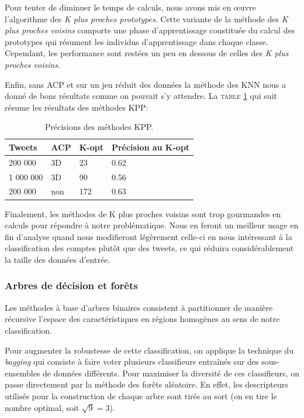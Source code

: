 \documentclass[twocolumn,10pt]{article}
\begin{document}
Pour tenter de diminuer le temps de calculs, nous avons mis en œuvre l'algorithme des \textit{K plus proches prototypes}. Cette variante de la méthode des \textit{K plus proches voisins} comporte une phase d'apprentissage constituée du calcul des prototypes qui résument les individus d'apprentissage dans chaque classe. Cependant, les performance sont restées un peu en dessous de celles des \textit{K plus proches voisins}.

Enfin, sans ACP et sur un jeu réduit des données la méthode des KNN nous a donné de bons résultats comme on pouvait s'y attendre. La \textsc{table} \ref{tab:PKPP} qui suit résume les résultats des méthodes KPP:

\begin{table}[htbp]
\begin{center}
\noindent\begin{tabular}{llll}
Tweets & ACP & K-opt & Précision au K-opt \\ 
\hline 
200 000 & 3D & 23 & 0.62 \\
1 000 000 & 3D & 90 & 0.56 \\
200 000 & non & 172 & 0.63 \\
\end{tabular}
\caption{\label{tab:PKPP} Précisions des méthodes KPP.}
\end{center} 
\end{table}

Finalement, les méthodes de K plus proches voisins sont trop gourmandes en calculs pour répondre à notre problématique. Nous en feront un meilleur usage en fin d'analyse quand nous modifieront légèrement celle-ci en nous intéressant à la classification des comptes plutôt que des tweets, ce qui réduira considérablement la taille des données d'entrée.

\subsubsection{Arbres de décision et forêts}

Les méthodes à base d'arbres binaires consistent à partitionner de manière récursive
l'espace des caractéristiques en régions homogènes au sens de notre classification.

Pour augmenter la robustesse de cette classification, on applique la technique du \textit{bagging} qui consiste à faire voter plusieurs classifieurs entraînés sur des sous-ensembles de données différents. Pour maximiser la diversité de ces classifieurs, on passe directement par la méthode des forêts aléatoire. En effet, les descripteurs utilisés pour la construction de chaque arbre sont tirés au sort (on en tire le nombre optimal, soit $\sqrt{9}=3$).
\end{document}

